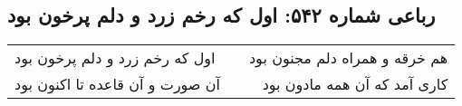 \begin{center}
\section*{رباعی شماره ۵۴۲: اول که رخم زرد و دلم پرخون بود}
\label{sec:0542}
\begin{longtable}{l p{0.5cm} r}
اول که رخم زرد و دلم پرخون بود
&&
هم خرقه و همراه دلم مجنون بود
\\
آن صورت و آن قاعده تا اکنون بود
&&
کاری آمد که آن همه مادون بود
\\
\end{longtable}
\end{center}
